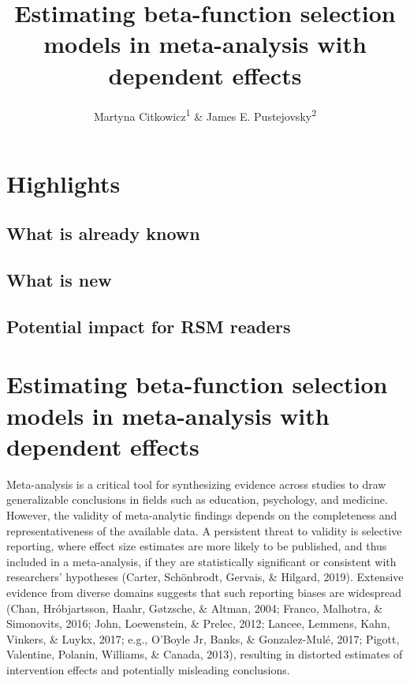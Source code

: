 \documentclass[
  american,
  man, donotrepeattitle,floatsintext]{apa7}
\title{Estimating beta-function selection models in meta-analysis with dependent effects}
\author{Martyna Citkowicz\textsuperscript{1} \& James E. Pustejovsky\textsuperscript{2}}
\date{}
\affiliation{\vspace{0.5cm}\textsuperscript{1} American Institutes for Research\\\textsuperscript{2} University of Wisconsin-Madison}
\begin{document}
\maketitle

\section*{Highlights}\label{highlights}

\subsection*{What is already known}\label{what-is-already-known}

\subsection*{What is new}\label{what-is-new}

\subsection*{Potential impact for RSM readers}\label{potential-impact-for-rsm-readers}

\newpage

\section{Estimating beta-function selection models in meta-analysis with dependent effects}\label{introduction}

Meta-analysis is a critical tool for synthesizing evidence across studies to draw generalizable conclusions in fields such as education, psychology, and medicine. However, the validity of meta-analytic findings depends on the completeness and representativeness of the available data. A persistent threat to validity is selective reporting, where effect size estimates are more likely to be published, and thus included in a meta-analysis, if they are statistically significant or consistent with researchers' hypotheses (Carter, Schönbrodt, Gervais, \& Hilgard, 2019). Extensive evidence from diverse domains suggests that such reporting biases are widespread (Chan, Hróbjartsson, Haahr, Gøtzsche, \& Altman, 2004; Franco, Malhotra, \& Simonovits, 2016; John, Loewenstein, \& Prelec, 2012; Lancee, Lemmens, Kahn, Vinkers, \& Luykx, 2017; e.g., O'Boyle Jr, Banks, \& Gonzalez-Mulé, 2017; Pigott, Valentine, Polanin, Williams, \& Canada, 2013), resulting in distorted estimates of intervention effects and potentially misleading conclusions.
\end{document}
